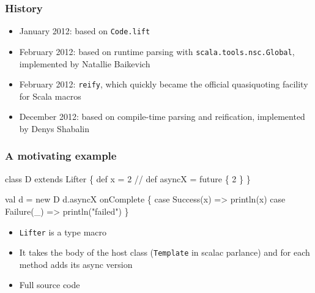 \documentclass[svgnames,hyperref={bookmarks=false}]{beamer}
\begin{document}
\begin{frame}[fragile]
\frametitle{}

\vskip40pt
\begin{center}
\end{center}
\end{frame}

\begin{frame}[fragile]
\frametitle{History}

\begin{itemize}
\item January 2012:  based on \texttt{Code.lift}
\item February 2012:  based on runtime parsing with \texttt{scala.tools.nsc.Global}, implemented by Natallie Baikevich
\item February 2012: \texttt{reify}, which quickly became the official quasiquoting facility for Scala macros
\item December 2012:  based on compile-time parsing and reification, implemented by Denys Shabalin
\end{itemize}
\end{frame}

\begin{frame}[fragile]
\frametitle{A motivating example}

\begin{semiverbatim}
class D extends Lifter \{
  def x = 2
  // def asyncX = future \{ 2 \}
\}

val d = new D
d.asyncX onComplete \{
  case Success(x) => println(x)
  case Failure(_) => println("failed")
\}
\end{semiverbatim}

\begin{itemize}
\item \texttt{Lifter} is a type macro
\item It takes the body of the host class (\texttt{Template} in scalac parlance) and for each method adds its async version
\item Full source code 
\end{itemize}
\end{frame}
\end{document}
